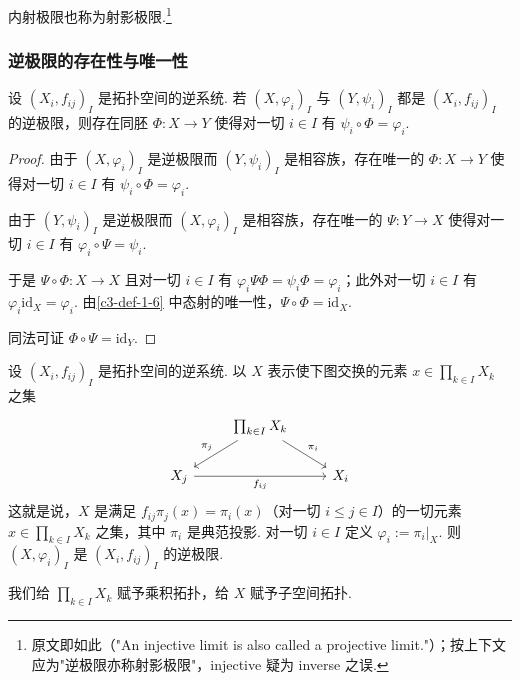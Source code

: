 \begin{remark}\label{c3-rem-1-7}
内射极限也称为射影极限.\footnote{原文即如此（"An injective limit is also called a projective limit."）；按上下文应为"逆极限亦称射影极限"，injective 疑为 inverse 之误.}
\end{remark}

\subsubsection{逆极限的存在性与唯一性}

\begin{proposition}\label{c3-prop-1-1}
设 $(X_i,f_{ij})_I$ 是拓扑空间的逆系统. 若 $(X,\varphi_i)_I$ 与 $(Y,\psi_i)_I$ 都是 $(X_i,f_{ij})_I$ 的逆极限，则存在同胚 $\Phi:X\to Y$ 使得对一切 $i\in I$ 有 $\psi_i\circ\Phi=\varphi_i$.
\end{proposition}

\begin{proof}
由于 $(X,\varphi_i)_I$ 是逆极限而 $(Y,\psi_i)_I$ 是相容族，存在唯一的 $\Phi:X\to Y$ 使得对一切 $i\in I$ 有 $\psi_i\circ\Phi=\varphi_i$.

由于 $(Y,\psi_i)_I$ 是逆极限而 $(X,\varphi_i)_I$ 是相容族，存在唯一的 $\Psi:Y\to X$ 使得对一切 $i\in I$ 有 $\varphi_i\circ\Psi=\psi_i$.

于是 $\Psi\circ\Phi:X\to X$ 且对一切 $i\in I$ 有 $\varphi_i\Psi\Phi=\psi_i\Phi=\varphi_i$；此外对一切 $i\in I$ 有 $\varphi_i\mathrm{id}_X=\varphi_i$. 由\autoref{c3-def-1-6} 中态射的唯一性，$\Psi\circ\Phi=\mathrm{id}_X$.

同法可证 $\Phi\circ\Psi=\mathrm{id}_Y$.
\end{proof}

\begin{proposition}\label{c3-prop-1-2}
设 $(X_i,f_{ij})_I$ 是拓扑空间的逆系统. 以 $X$ 表示使下图交换的元素 $x\in\prod_{k\in I}X_k$ 之集
\[
\begin{tikzcd}
& \prod_{k\in I}X_k \arrow[dl, "\pi_j"'] \arrow[dr, "\pi_i"] & \\
X_j \arrow[rr, "f_{ij}"'] & & X_i
\end{tikzcd}
\]
这就是说，$X$ 是满足 $f_{ij}\pi_j(x)=\pi_i(x)$（对一切 $i\leq j\in I$）的一切元素 $x\in\prod_{k\in I}X_k$ 之集，其中 $\pi_i$ 是典范投影. 对一切 $i\in I$ 定义 $\varphi_i:=\pi_i|_X$. 则 $(X,\varphi_i)_I$ 是 $(X_i,f_{ij})_I$ 的逆极限.
\end{proposition}

\begin{remark}\label{c3-rem-1-8}
我们给 $\prod_{k\in I}X_k$ 赋予乘积拓扑，给 $X$ 赋予子空间拓扑.
\end{remark}

